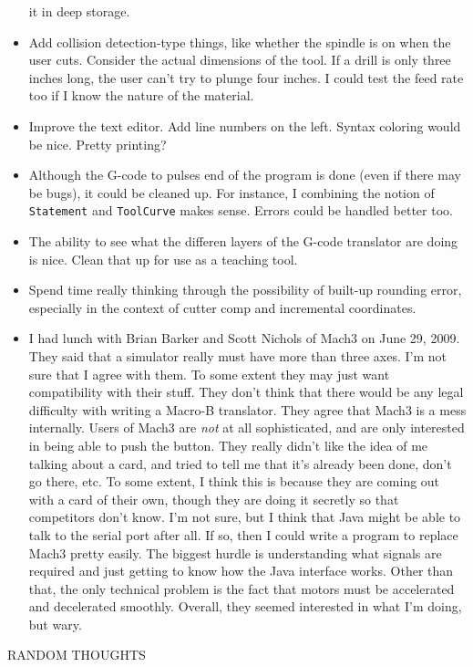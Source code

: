 \documentclass[titlepage,oneside,10pt]{article}
\begin{document}
\begin{itemize}
  it in deep storage.
\item Add collision detection-type things, like whether the spindle is
  on when the user cuts. Consider the actual dimensions of the
  tool. If a drill is only three inches long, the user can't try to
  plunge four inches. I could test the feed rate too if I know the
  nature of the material.
\item Improve the text editor. Add line numbers on the left. Syntax
  coloring would be nice. Pretty printing?
\item Although the G-code to pulses end of the program is done (even
  if there may be bugs), it could be cleaned up. For instance, I
  combining the notion of {\tt Statement} and {\tt ToolCurve} makes
  sense. Errors could be handled better too.
\item The ability to see what the differen layers of the G-code
  translator are doing is nice. Clean that up for use as a teaching
  tool.
\item Spend time really thinking through the possibility of built-up
  rounding error, especially in the context of cutter comp and
  incremental coordinates.
\item I had lunch with Brian Barker and Scott Nichols of Mach3 on June
  29, 2009. They said that a simulator really must have more than
  three axes. I'm not sure that I agree with them. To some extent
  they may just want compatibility with their stuff. They don't think
  that there would be any legal difficulty with writing a Macro-B
  translator. They agree that Mach3 is a mess internally. Users of
  Mach3 are \emph{not} at all sophisticated, and are only interested
  in being able to push the button. They really didn't like the idea
  of me talking about a card, and tried to tell me that it's already
  been done, don't go there, etc. To some extent, I think this is
  because they are coming out with a card of their own, though they
  are doing it secretly so that competitors don't know. I'm not sure,
  but I think that Java might be able to talk to the serial port after
  all. If so, then I could write a program to replace Mach3 pretty
  easily. The biggest hurdle is understanding what signals are
  required and just getting to know how the Java interface
  works. Other than that, the only technical problem is the fact that
  motors must be accelerated and decelerated smoothly. Overall, they
  seemed interested in what I'm doing, but wary.
\end{itemize}

\vskip 1cm
RANDOM THOUGHTS 
\end{document}

